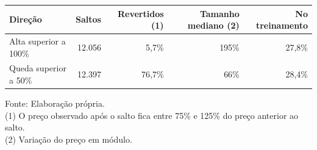 \begingroup
\setlength{}
\setlength{}
\fontsize{10.5pt}{12.6pt}\selectfont

\setlength{\LTpost}{0mm}
\begin{longtable}{@{\extracolsep{\fill}}lrrrr}

\toprule
\textbf{Direção} & \textbf{Saltos} & \textbf{Revertidos} (1) & \textbf{Tamanho mediano} (2) & \textbf{No treinamento} \\ 
\midrule\addlinespace[2.5pt]
Alta superior a 100\% & 12.056 & 5,7\% & 195\% & 27,8\% \\
Queda superior a 50\% & 12.397 & 76,7\% & 66\% & 28,4\% \\
\bottomrule
\end{longtable}
\begin{minipage}{\linewidth}
Fonte: Elaboração própria.\\
(1) O preço observado após o salto fica entre 75\% e 125\% do preço anterior ao salto.\\
(2) Variação do preço em módulo.\\
\end{minipage}
\endgroup
